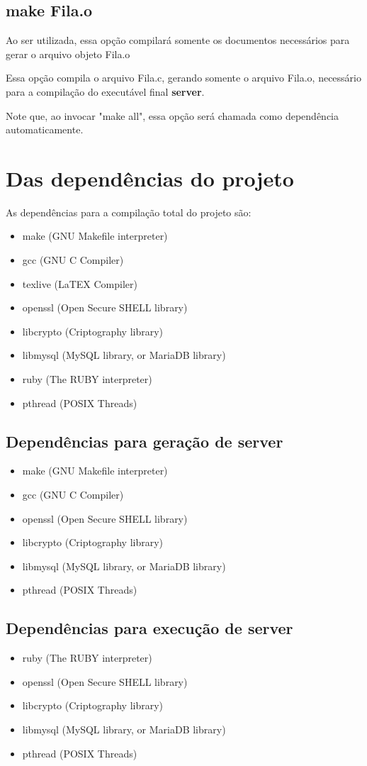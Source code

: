 \documentclass[onecolumn,12pt]{article}
\begin{document}
			\subsection{make Fila.o}
				Ao ser utilizada, essa opção compilará somente os documentos necessários para gerar o arquivo objeto Fila.o\par
				Essa opção compila o arquivo Fila.c, gerando somente o arquivo Fila.o, necessário para a compilação do executável final \textbf{server}.\par
				Note que, ao invocar "make all", essa opção será chamada como dependência automaticamente.
	
		\section{Das dependências do projeto}
			As dependências para a compilação total do projeto são:
			\begin{itemize}
				\item make		(GNU Makefile interpreter)
				\item gcc		(GNU C Compiler)
				\item texlive	(LaTEX Compiler)
				\item openssl	(Open Secure SHELL library)
				\item libcrypto	(Criptography library)
				\item libmysql	(MySQL library, or MariaDB library)
				\item ruby		(The RUBY interpreter)
				\item pthread	(POSIX Threads)
			\end{itemize}
			\subsection{Dependências para \textbf{geração} de \textbf{server}}
				\begin{itemize}
					\item make		(GNU Makefile interpreter)
					\item gcc		(GNU C Compiler)
					\item openssl	(Open Secure SHELL library)
					\item libcrypto	(Criptography library)
					\item libmysql	(MySQL library, or MariaDB library)
					\item pthread	(POSIX Threads)
				\end{itemize}
			\subsection{Dependências para \textbf{execução} de \textbf{server}}
				\begin{itemize}
					\item ruby		(The RUBY interpreter)
					\item openssl	(Open Secure SHELL library)
					\item libcrypto	(Criptography library)
					\item libmysql	(MySQL library, or MariaDB library)
					\item pthread	(POSIX Threads)
				\end{itemize}
\end{document}
